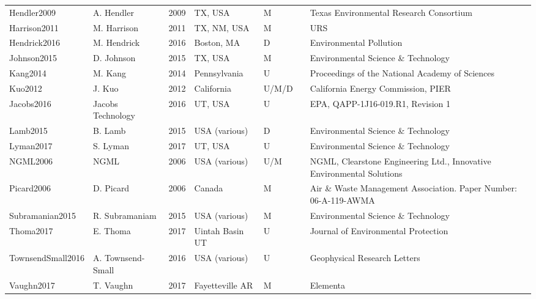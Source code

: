 \documentclass[11pt]{report}
\begin{document}
\begin{landscape}
\begin{table}[]
\begin{scriptsize}
\begin{tabular*}{1\columnwidth}{lllllll}
Hendler2009		& A.  Hendler  		& 2009 	& TX, USA        	& M     	&\cite{Hendler2009}         & Texas Environmental Research Consortium         \\
Harrison2011      	& M. Harrison  	& 2011 	& TX, NM, USA    	& M     	& \cite{Harrison2011} & URS     \\
Hendrick2016      	& M. Hendrick 		 & 2016 	& Boston, MA     	& D     	& \cite{Hendrick2016}& Environmental Pollution     \\
Johnson2015       	& D. Johnson   	& 2015 	& TX, USA        	& M     	& \cite{Johnson2015}      & Environmental Science \& Technology   \\
Kang2014	& M. Kang      		& 2014 	& Pennsylvania   	& U     	& \cite{Kang2014}      & Proceedings of the National Academy of Sciences \\
Kuo2012 	& J. Kuo       		& 2012 	& California     		& U/M/D 	& \cite{Kuo2012}         & California Energy Commission, PIER    \\
Jacobs2016        	& Jacobs Technology      	& 2016 	& UT, USA        	& U     	& \cite{Jacobs2016}       & EPA, QAPP-1J16-019.R1, Revision 1     \\
Lamb2015	& B. Lamb      		& 2015 	& USA (various)  	& D     	& \cite{Lamb2015}      & Environmental Science \& Technology   \\
Lyman2017         	& S. Lyman     		& 2017 	& UT, USA        	& U     	& \cite{Lyman2017}   & Environmental Science \& Technology   \\
NGML2006         	& NGML         		& 2006 	& USA (various)  	& U/M   	& \cite{NGML2006}         				 & NGML, Clearstone Engineering Ltd., Innovative Environmental Solutions         \\
Picard2006        	& D. Picard    		& 2006 	& Canada         	& M     	& \cite{Picard2006}& Air \& Waste Management Association. Paper Number: 06-A-119-AWMA    \\     
Subramanian2015   	& R. Subramaniam         	& 2015 	& USA (various)  	& M     	& \cite{Subramanian2015}   						 & Environmental Science \& Technology   \\
Thoma2017        	& E. Thoma     	& 2017 	& Uintah Basin UT	& U     	& \cite{Thoma2017}        & Journal of Environmental Protection   \\
TownsendSmall2016 & A. Townsend-Small      	& 2016 	& USA (various)  	& U     	& \cite{TownsendSmall2016}        & Geophysical Research Letters       \\
Vaughn2017        	& T. Vaughn   		& 2017 	& Fayetteville AR	& M     	& \cite{Vaughn2017}        & Elementa\\

\end{tabular*}
\end{scriptsize}
\end{table}
\end{landscape}
\end{document}

